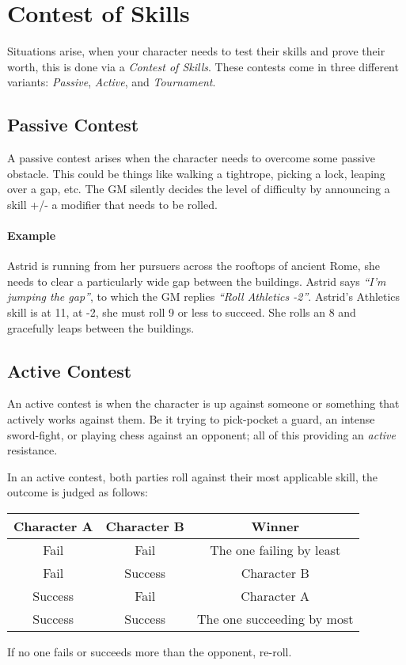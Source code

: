 \newpage
\section{Contest of Skills}\label{sec:contest}
Situations arise, when your character needs to test their skills and prove their worth, this is done via a \textit{Contest of Skills}.
These contests come in three different variants: \textit{Passive}, \textit{Active}, and \textit{Tournament}.

\subsection{Passive Contest}
A passive contest arises when the character needs to overcome some passive obstacle. This could be things like walking a tightrope, picking a lock, leaping over a gap, etc.
The GM silently decides the level of difficulty by announcing a skill +/- a modifier that needs to be rolled.

\paragraph{Example} Astrid is running from her pursuers across the rooftops of ancient Rome, she needs to clear a particularly wide gap between the buildings. Astrid says \textit{``I'm jumping the gap''}, to which the GM replies \textit{``Roll Athletics -2''}. Astrid's Athletics skill is at 11, at -2, she must roll 9 or less to succeed. She rolls an 8 and gracefully leaps between the buildings.

\subsection{Active Contest}
An active contest is when the character is up against someone or something that actively works against them. Be it trying to pick-pocket a guard, an intense sword-fight, or playing chess against an opponent; all of this providing an \textit{active} resistance.

In an active contest, both parties roll against their most applicable skill, the outcome is judged as follows:

\begin{center}
    \begin{tabular}{c|c|c}
    \textbf{Character A} & \textbf{Character B} & \textbf{Winner}\\\hline
    Fail & Fail & The one failing by least \\
    Fail & Success & Character B \\
    Success & Fail & Character A \\
    Success & Success & The one succeeding by most
    \end{tabular}
\end{center}
If no one fails or succeeds more than the opponent, re-roll.

